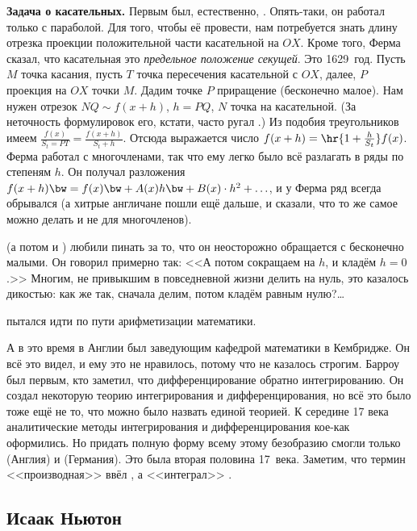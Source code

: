 \documentclass[a4paper,oneside,fleqn,10pt]{article}
\begin{document}
\textbf{Задача о касательных.} Первым был, естественно, .  Опять-таки, он работал только с параболой. Для
того, чтобы её провести, нам потребуется знать длину отрезка проекции
положительной части касательной на $OX$.  Кроме того, Ферма сказал,
что касательная это \emph{предельное положение секущей}.  Это
1629~год.   Пусть $M$ точка касания, пусть $T$ точка
пересечения касательной с $OX$, далее, $P$ проекция на $OX$ точки
$M$. Дадим точке $P$ приращение (бесконечно малое).  Нам нужен отрезок
$NQ \sim f(x +h)$, $h = PQ$, $N$ точка на касательной.  (За неточность
формулировок его, кстати, часто ругал .)  Из подобия
треугольников имеем $\frac{f(x)}{S_t = PT} = \frac{f(x+h)}{S_t + h}$.
Отсюда выражается число $f(x+h) = \hr{1 + \frac{h}{S_t}}f(x)$.  Ферма
работал с многочленами, так что ему легко было всё разлагать в ряды по
степеням $h$.  Он получал разложения $f(x+h) \bw= f(x) \bw+ A(x) h
\bw+ B(x)\cdot h^2 +\ldots$, и у Ферма ряд всегда обрывался (а хитрые
англичане пошли ещё дальше, и сказали, что то же самое можно делать и
не для многочленов).

 (а потом и ) любили пинать за
то, что он неосторожно обращается с бесконечно малыми.  Он говорил
примерно так: <<А потом сокращаем на $h$, и кладём $h = 0$.>> Многим,
не привыкшим в повседневной жизни делить на нуль, это казалось
дикостью: как же так, сначала делим, потом кладём равным нулю?\ldots

 пытался идти по пути арифметизации математики.

А в это время в Англии  был
заведующим кафедрой математики в Кембридже. Он всё это видел, и ему
это не нравилось, потому что не казалось строгим.  Барроу был первым,
кто заметил, что дифференцирование обратно интегрированию.  Он создал
некоторую теорию интегрирования и дифференцирования, но всё это было
тоже ещё не то, что можно было назвать единой теорией.  К середине 17
века аналитические методы интегрирования и дифференцирования кое-как
оформились.  Но придать полную форму всему этому безобразию смогли
только  (Англия) и  (Германия). Это была
вторая половина 17~века.  Заметим, что термин <<производная>> ввёл
, а <<интеграл>> .

\subsection{Исаак Ньютон}
\end{document}

